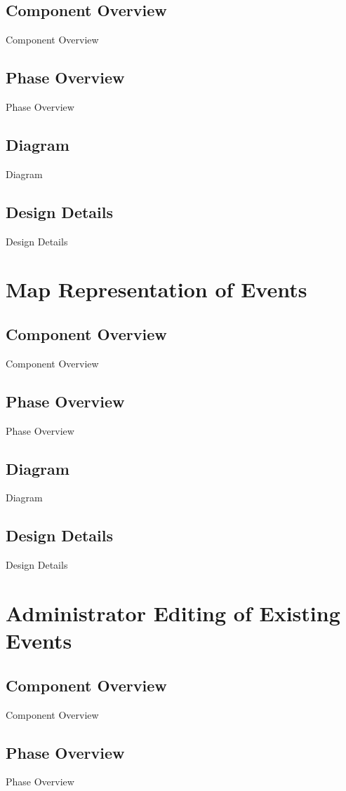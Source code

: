 \subsection{Component  Overview}
Component Overview
\subsection{Phase Overview}
Phase Overview
\subsection{Diagram}
Diagram
\subsection{Design Details}
Design Details

\section{Map Representation of Events }

\subsection{Component  Overview}
Component Overview
\subsection{Phase Overview}
Phase Overview
\subsection{Diagram}
Diagram
\subsection{Design Details}
Design Details

\section{Administrator Editing of Existing Events}

\subsection{Component  Overview}
Component Overview
\subsection{Phase Overview}
Phase Overview
